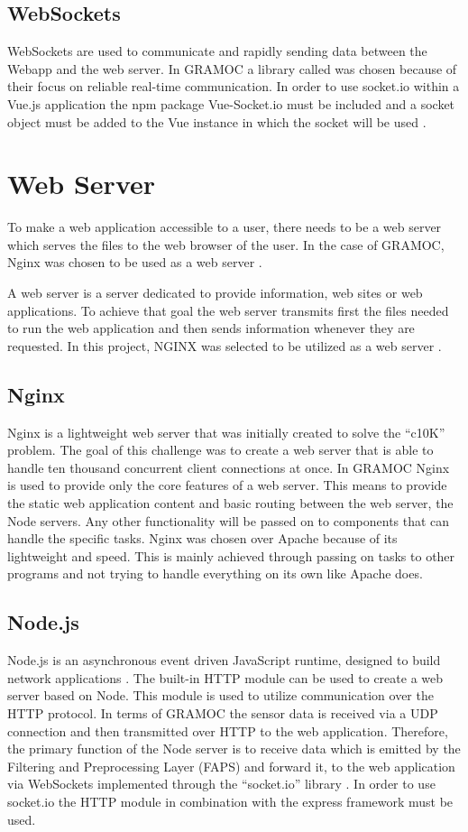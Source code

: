 \subsection{WebSockets}
WebSockets are used to communicate and rapidly sending data between the Webapp and the web server. In GRAMOC a library called  was chosen because of their focus on reliable real-time communication. In order to use socket.io within a Vue.js application the npm package Vue-Socket.io must be included and a socket object must be added to the Vue instance in which the socket will be used \autocite{vuesocketio}.

\section{Web Server}
\label{sec:webserver}
To make a web application accessible to a user, there needs to be a web server which serves the files to the web browser of the user. In the case of GRAMOC, Nginx was chosen to be used as a web server \autocite{nginx}.

A web server is a server dedicated to provide information, web sites or web applications. To achieve that goal the web server transmits first the files needed to run the web application and then sends information whenever they are requested. In this project, NGINX was selected to be utilized as a web server \autocite{nginx}.

\subsection{Nginx}
Nginx is a lightweight web server that was initially created to solve the ``c10K'' problem. The goal of this challenge was to create a web server that is able to handle ten thousand concurrent client connections at once. In GRAMOC Nginx is used to provide only the core features of a web server. This means to provide the static web application content and basic routing between the web server, the Node servers. Any other functionality will be passed on to components that can handle the specific tasks. Nginx was chosen over Apache because of its lightweight and speed. This is mainly achieved through passing on tasks to other programs and not trying to handle everything on its own like Apache does.

\subsection{Node.js}
\label{subsec:nodejs}
Node.js is an asynchronous event driven JavaScript runtime, designed to build network applications \autocite{Node}. The built-in HTTP module can be used to create a web server based on Node. This module is used to utilize communication over the HTTP protocol. In terms of GRAMOC the sensor data is received via a UDP connection and then transmitted over HTTP to the web application. Therefore, the primary function of the Node server is to receive data which is emitted by the Filtering and Preprocessing Layer (FAPS) and forward it, to the web application via WebSockets implemented through the ``socket.io'' library \autocite{socketio}. In order to use socket.io the HTTP module in combination with the express framework must be used.

